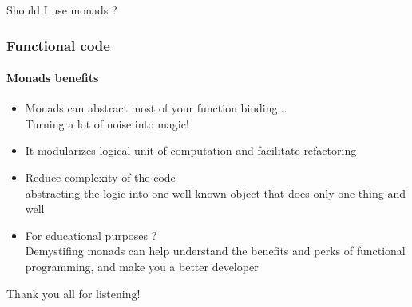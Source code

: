 \begin{frame}
  \centering
  \Huge Should I use monads ?
\end{frame}

\begin{frame}
  \frametitle{Functional code}
  \framesubtitle{Monads benefits}

  \begin{itemize}[<+->]
    \item Monads can abstract most of your function binding...
        \\\textcolor{ecgrey!50}{Turning a lot of noise into magic!}
    \item It modularizes logical unit of computation and facilitate refactoring
    \item Reduce complexity of the code
        \\\textcolor{ecgrey!50}{abstracting the logic into one well known object
        that does only one thing and well}
    \item For educational purposes ?
        \\\textcolor{ecgrey!50}{Demystifing monads can help understand
          the benefits and perks of functional programming, and make you a better
          developer}
  \end{itemize}
\end{frame}

\begin{frame}
  \centering
  \Huge Thank you all for listening!
\end{frame}
